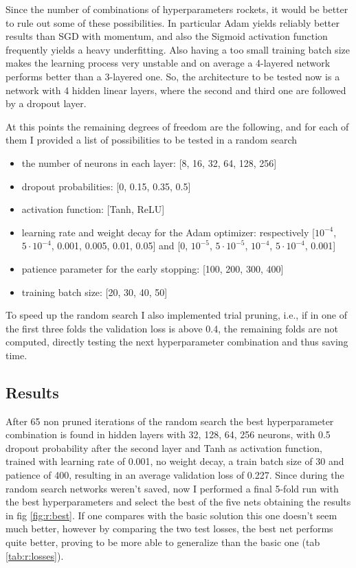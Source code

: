 \documentclass[a4paper, 11pt]{article}
\begin{document}
    Since the number of combinations of hyperparameters rockets, it would be better to rule out some of these possibilities.
    In particular Adam yields reliably better results than SGD with momentum, and also the Sigmoid activation function frequently yields a heavy underfitting. Also having a too small training batch size makes the learning process very unstable and on average a 4-layered network performs better than a 3-layered one. So, the architecture to be tested now is a network with 4 hidden linear layers, where the second and third one are followed by a dropout layer.

    At this points the remaining degrees of freedom are the following, and for each of them I provided a list of possibilities to be tested in a random search
    \begin{itemize}
      \item the number of neurons in each layer: [8, 16, 32, 64, 128, 256]
      \item dropout probabilities: [0, 0.15, 0.35, 0.5]
      \item activation function: [Tanh, ReLU]
      \item learning rate and weight decay for the Adam optimizer: respectively [$10^{-4}$, $5\cdot10^{-4}$, 0.001, 0.005, 0.01, 0.05] and [0, $10^{-5}$, $5\cdot10^{-5}$, $10^{-4}$, $5\cdot10^{-4}$, 0.001]
      \item patience parameter for the early stopping: [100, 200, 300, 400]
      \item training batch size: [20, 30, 40, 50]
    \end{itemize}
    To speed up the random search I also implemented trial pruning, i.e., if in one of the first three folds the validation loss is above 0.4, the remaining folds are not computed, directly testing the next hyperparameter combination and thus saving time.

  \subsection{Results}
    After 65 non pruned iterations of the random search the best hyperparameter combination is found in hidden layers with 32, 128, 64, 256 neurons, with 0.5 dropout probability after the second layer and Tanh as activation function, trained with learning rate of 0.001, no weight decay, a train batch size of 30 and patience of 400, resulting in an average validation loss of 0.227.
    Since during the random search networks weren't saved, now I performed a final 5-fold run with the best hyperparameters and select the best of the five nets obtaining the results in fig \ref{fig:r:best}. If one compares with the basic solution this one doesn't seem much better, however by comparing the two test losses, the best net performs quite better, proving to be more able to generalize than the basic one (tab \ref{tab:r:losses}).
\end{document}
